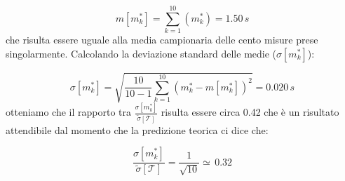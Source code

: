 \begin{equation}
m[m_k^*] = \sum_{k=1}^{10} (m_k^*) = 1.50\,s
\end{equation}
che risulta essere uguale alla media campionaria delle cento misure prese singolarmente. Calcolando la deviazione standard delle medie ($ \sigma[m_k^*] $):

\begin{equation}
\sigma[m_k^*] = \sqrt{\frac{10}{10-1} \sum_{k=1}^{10} (m_k^* - m[m_k^*])^2} = 0.020\,s
\end{equation}
otteniamo che il rapporto tra $\frac{\sigma[m_k^*]}{\tilde{\sigma}[\mathcal{T}]}$ risulta essere circa 0.42 che è un risultato attendibile dal momento che la predizione teorica ci dice che:

\begin{equation}
\frac{\sigma[m_k^*]}{\tilde{\sigma}[\mathcal{T}]} = \frac{1}{\sqrt{10}} \simeq \, 0.32
\end{equation}
